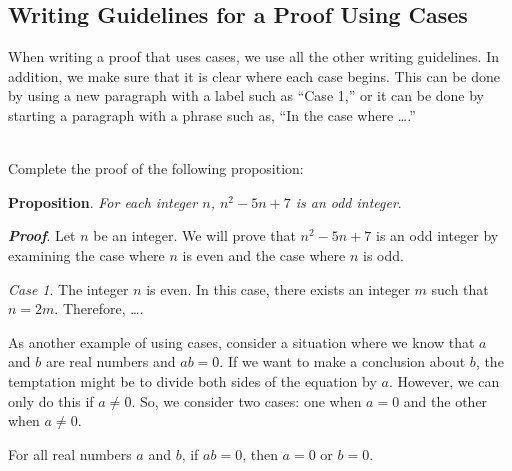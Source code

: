 \subsection*{Writing Guidelines for a Proof Using Cases}
When writing a proof that uses cases, we use all the other writing guidelines.  In addition, we make sure that it is clear where each case begins.  This can be done by using a new paragraph with a label such as ``Case 1,'' or it can be done by starting a paragraph with a phrase such as, ``In the case where \ldots.''  %

\begin{prog} 
\label{pr:n-even-odd} \hfill \\
Complete the proof of the following proposition:

\vskip6pt
\noindent
\textbf{Proposition}. \emph{For each integer $n$, $n^2 - 5n + 7$ is an odd integer}.

\noindent
\textit{\textbf{Proof}}.  Let $n$ be an integer.  We will prove that $n^2 - 5n + 7$ is an odd integer by examining the case where $n$ is even and the case where $n$ is odd.


\newpar
\textit{Case 1}.  The integer $n$ is even.  In this case, there exists an integer $m$ such that $n = 2m$.  
Therefore, \ldots .
\end{prog}
\hbreak

\newpar
As another example of using cases, consider a situation where we know that $a$ and $b$ are real numbers and 
$ab = 0$.  If we want to make a conclusion about $b$, the temptation might be to divide both sides of the equation by $a$.  However, we can only do this if $a \ne 0$.  So, we consider two cases:  one when $a = 0$ and the other when $a \ne 0$.


%

\begin{proposition}
For all real numbers $a$ and $b$, if $ab = 0$, then $a = 0$ or $b = 0$. \label{prop:zeroproperty}
\end{proposition}

